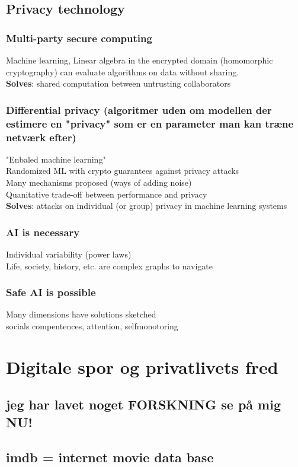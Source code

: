 \documentclass[11pt, fleqn]{article}
\begin{document}
	\subsection*{Privacy technology}
	\noindent
	\subsubsection*{Multi-party secure computing} 
	\vspace*{-0.2cm} \noindent
	Machine learning, Linear algebra in the encrypted domain (homomorphic cryptography) can evaluate algorithms on data without sharing. \\ \textbf{Solves}: shared computation between untrusting collaborators \\ 
	
	\subsubsection*{Differential privacy (algoritmer uden om modellen der estimere en "privacy" som er en parameter man kan træne netværk efter)} "Enbaled machine learning" \\
	Randomized ML with crypto guarantees against privacy attacks \\
	Many mechanisms proposed (ways of adding noise) \\
	Quanitative trade-off between performance and privacy \\
	\textbf{Solves}: attacks on individual (or group) privacy in machine learning systems
	
	\subsubsection*{AI is necessary}
	\vspace*{-0.2cm}
	Individual variability (power laws) \\
	Life, society, history, etc. are complex graphs to navigate 
	
	\subsubsection*{Safe AI is possible}
	\vspace*{-0.2cm}
	Many dimensions have solutions sketched \\
	socials compentences, attention, selfmonotoring \\
	
	\section*{Digitale spor og privatlivets fred}
	
	\subsection*{jeg har lavet noget FORSKNING se på mig NU!}
	\vspace*{-0.2cm}
	\subsection*{imdb = internet movie data base}
	\vspace*{-0.2cm}
	
	 
	
\end{document}
